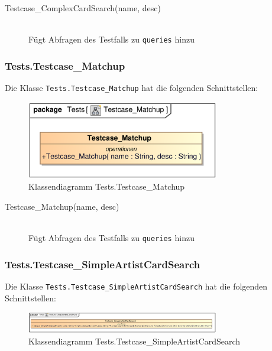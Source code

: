 \begin{description}
    \item[Testcase\_ComplexCardSearch(name, desc)] \hfill \\
    Fügt Abfragen des Testfalls zu \verb|queries| hinzu
\end{description}

\subsubsection{Tests.Testcase\_Matchup}
Die Klasse \verb|Tests.Testcase_Matchup| hat die folgenden Schnittstellen:

\begin{figure}[H]
    \myfloatalign
    \includegraphics[width=0.75\textwidth]{gfx/MtGDeepAnalysis/Testcase_Matchup.eps}
    \caption{Klassendiagramm Tests.Testcase\_Matchup}
    \label{fig:class:tests.Testcase_Matchup}
\end{figure}

\begin{description}
    \item[Testcase\_Matchup(name, desc)] \hfill \\
    Fügt Abfragen des Testfalls zu \verb|queries| hinzu
\end{description}

\subsubsection{Tests.Testcase\_SimpleArtistCardSearch}
Die Klasse \verb|Tests.Testcase_SimpleArtistCardSearch| hat die folgenden Schnittstellen:

\begin{figure}[H]
    \myfloatalign
    \includegraphics[width=0.75\textwidth]{gfx/MtGDeepAnalysis/Testcase_SimpleArtistCardSearch.eps}
    \caption{Klassendiagramm Tests.Testcase\_SimpleArtistCardSearch}
    \label{fig:class:tests.Testcase_SimpleArtistCardSearch}
\end{figure}


